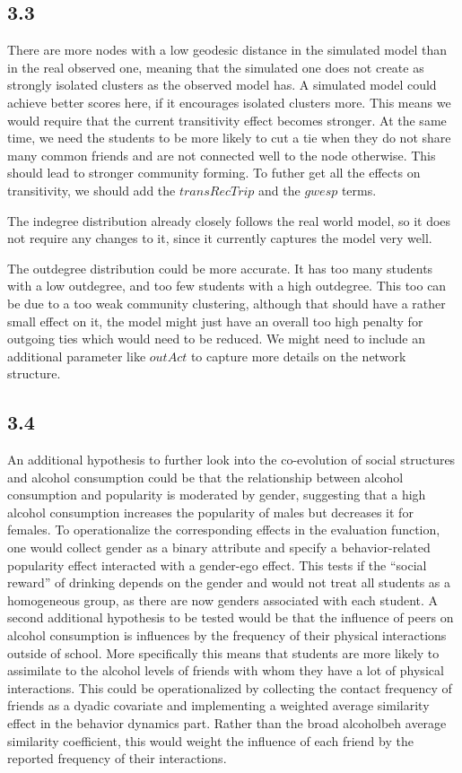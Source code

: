 \documentclass[
]{article}
\begin{document}
\subsection{3.3}\label{section-21}

There are more nodes with a low geodesic distance in the simulated model
than in the real observed one, meaning that the simulated one does not
create as strongly isolated clusters as the observed model has. A
simulated model could achieve better scores here, if it encourages
isolated clusters more. This means we would require that the current
transitivity effect becomes stronger. At the same time, we need the
students to be more likely to cut a tie when they do not share many
common friends and are not connected well to the node otherwise. This
should lead to stronger community forming. To futher get all the effects
on transitivity, we should add the \(transRecTrip\) and the \(gwesp\)
terms.

The indegree distribution already closely follows the real world model,
so it does not require any changes to it, since it currently captures
the model very well.

The outdegree distribution could be more accurate. It has too many
students with a low outdegree, and too few students with a high
outdegree. This too can be due to a too weak community clustering,
although that should have a rather small effect on it, the model might
just have an overall too high penalty for outgoing ties which would need
to be reduced. We might need to include an additional parameter like
\(outAct\) to capture more details on the network structure.

\subsection{3.4}\label{section-22}

An additional hypothesis to further look into the co-evolution of social
structures and alcohol consumption could be that the relationship
between alcohol consumption and popularity is moderated by gender,
suggesting that a high alcohol consumption increases the popularity of
males but decreases it for females. To operationalize the corresponding
effects in the evaluation function, one would collect gender as a binary
attribute and specify a behavior-related popularity effect interacted
with a gender-ego effect. This tests if the ``social reward'' of
drinking depends on the gender and would not treat all students as a
homogeneous group, as there are now genders associated with each
student. A second additional hypothesis to be tested would be that the
influence of peers on alcohol consumption is influences by the frequency
of their physical interactions outside of school. More specifically this
means that students are more likely to assimilate to the alcohol levels
of friends with whom they have a lot of physical interactions. This
could be operationalized by collecting the contact frequency of friends
as a dyadic covariate and implementing a weighted average similarity
effect in the behavior dynamics part. Rather than the broad alcoholbeh
average similarity coefficient, this would weight the influence of each
friend by the reported frequency of their interactions.
\end{document}
